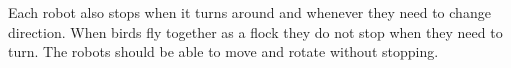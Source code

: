 Each robot also stops when it turns around and whenever they need to change direction. When birds fly together as a flock they do not stop when they need to turn. The robots should be able to move and rotate without stopping.






